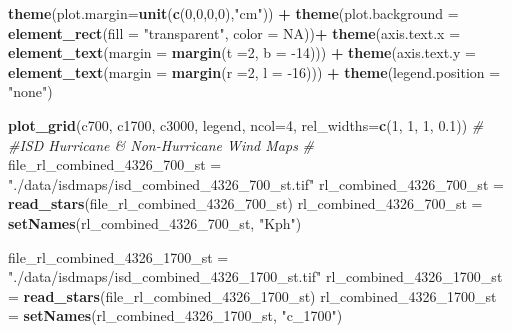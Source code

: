 \documentclass[12pt,oneside]{reedthesis}
\newenvironment{Shaded}{\begin{snugshade}}{\end{snugshade}}
\newcommand{\CommentTok}[1]{\textcolor[rgb]{0.56,0.35,0.01}{\textit{#1}}}
\newcommand{\DataTypeTok}[1]{\textcolor[rgb]{0.13,0.29,0.53}{#1}}
\newcommand{\DecValTok}[1]{\textcolor[rgb]{0.00,0.00,0.81}{#1}}
\newcommand{\FloatTok}[1]{\textcolor[rgb]{0.00,0.00,0.81}{#1}}
\newcommand{\KeywordTok}[1]{\textcolor[rgb]{0.13,0.29,0.53}{\textbf{#1}}}
\newcommand{\NormalTok}[1]{#1}
\newcommand{\OperatorTok}[1]{\textcolor[rgb]{0.81,0.36,0.00}{\textbf{#1}}}
\newcommand{\OtherTok}[1]{\textcolor[rgb]{0.56,0.35,0.01}{#1}}
\newcommand{\StringTok}[1]{\textcolor[rgb]{0.31,0.60,0.02}{#1}}
\begin{document}
\begin{Shaded}
\begin{Highlighting}[]
\StringTok{  }\KeywordTok{theme}\NormalTok{(}\DataTypeTok{plot.margin=}\KeywordTok{unit}\NormalTok{(}\KeywordTok{c}\NormalTok{(}\DecValTok{0}\NormalTok{,}\DecValTok{0}\NormalTok{,}\DecValTok{0}\NormalTok{,}\DecValTok{0}\NormalTok{),}\StringTok{"cm"}\NormalTok{)) }\OperatorTok{+}
\StringTok{  }\KeywordTok{theme}\NormalTok{(}\DataTypeTok{plot.background =} \KeywordTok{element_rect}\NormalTok{(}\DataTypeTok{fill =} \StringTok{"transparent"}\NormalTok{, }\DataTypeTok{color =} \OtherTok{NA}\NormalTok{))}\OperatorTok{+}
\StringTok{  }\KeywordTok{theme}\NormalTok{(}\DataTypeTok{axis.text.x =} \KeywordTok{element_text}\NormalTok{(}\DataTypeTok{margin =}  \KeywordTok{margin}\NormalTok{(}\DataTypeTok{t =}\DecValTok{2}\NormalTok{, }\DataTypeTok{b =} \DecValTok{-14}\NormalTok{))) }\OperatorTok{+}\StringTok{ }
\StringTok{  }\KeywordTok{theme}\NormalTok{(}\DataTypeTok{axis.text.y =} \KeywordTok{element_text}\NormalTok{(}\DataTypeTok{margin =}  \KeywordTok{margin}\NormalTok{(}\DataTypeTok{r =}\DecValTok{2}\NormalTok{, }\DataTypeTok{l =} \DecValTok{-16}\NormalTok{))) }\OperatorTok{+}
\StringTok{  }\KeywordTok{theme}\NormalTok{(}\DataTypeTok{legend.position =} \StringTok{"none"}\NormalTok{)}

\KeywordTok{plot_grid}\NormalTok{(c700, c1700, c3000, legend, }\DataTypeTok{ncol=}\DecValTok{4}\NormalTok{, }\DataTypeTok{rel_widths=}\KeywordTok{c}\NormalTok{(}\DecValTok{1}\NormalTok{, }\DecValTok{1}\NormalTok{, }\DecValTok{1}\NormalTok{, }\FloatTok{0.1}\NormalTok{))}
\CommentTok{#}
\CommentTok{#ISD Hurricane & Non-Hurricane Wind Maps}
\CommentTok{#}
\NormalTok{file_rl_combined_}\DecValTok{4326}\NormalTok{_}\DecValTok{700}\NormalTok{_st =}\StringTok{ "./data/isdmaps/isd_combined_4326_700_st.tif"}
\NormalTok{rl_combined_}\DecValTok{4326}\NormalTok{_}\DecValTok{700}\NormalTok{_st =}\StringTok{ }\KeywordTok{read_stars}\NormalTok{(file_rl_combined_}\DecValTok{4326}\NormalTok{_}\DecValTok{700}\NormalTok{_st)}
\NormalTok{rl_combined_}\DecValTok{4326}\NormalTok{_}\DecValTok{700}\NormalTok{_st =}\StringTok{ }\KeywordTok{setNames}\NormalTok{(rl_combined_}\DecValTok{4326}\NormalTok{_}\DecValTok{700}\NormalTok{_st, }\StringTok{"Kph"}\NormalTok{)}

\NormalTok{file_rl_combined_}\DecValTok{4326}\NormalTok{_}\DecValTok{1700}\NormalTok{_st =}\StringTok{ "./data/isdmaps/isd_combined_4326_1700_st.tif"}
\NormalTok{rl_combined_}\DecValTok{4326}\NormalTok{_}\DecValTok{1700}\NormalTok{_st =}\StringTok{ }\KeywordTok{read_stars}\NormalTok{(file_rl_combined_}\DecValTok{4326}\NormalTok{_}\DecValTok{1700}\NormalTok{_st)}
\NormalTok{rl_combined_}\DecValTok{4326}\NormalTok{_}\DecValTok{1700}\NormalTok{_st =}\StringTok{ }\KeywordTok{setNames}\NormalTok{(rl_combined_}\DecValTok{4326}\NormalTok{_}\DecValTok{1700}\NormalTok{_st, }\StringTok{"c_1700"}\NormalTok{)}


\end{Highlighting}
\end{Shaded}
\end{document}
